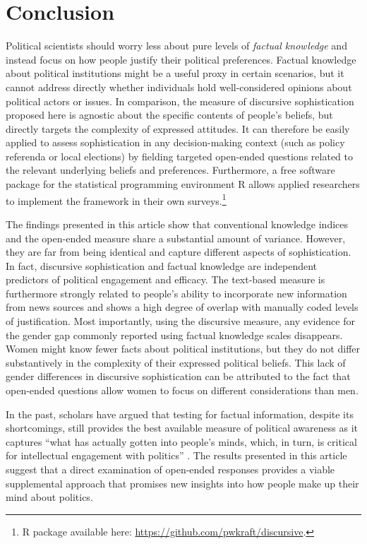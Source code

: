 \section*{Conclusion}

Political scientists should worry less about pure levels of \textit{factual knowledge} and instead focus on how people justify their political preferences. Factual knowledge about political institutions might be a useful proxy in certain scenarios, but it cannot address directly whether individuals hold well-considered opinions about political actors or issues. In comparison, the measure of discursive sophistication proposed here is agnostic about the specific contents of people's beliefs, but directly targets the complexity of expressed attitudes. It can therefore be easily applied to assess sophistication in any decision-making context (such as policy referenda or local elections) by fielding targeted open-ended questions related to the relevant underlying beliefs and preferences. Furthermore, a free software package for the statistical programming environment R allows applied researchers to implement the framework in their own surveys.\footnote{R package available here: \url{https://github.com/pwkraft/discursive}.}

The findings presented in this article show that conventional knowledge indices and the open-ended measure share a substantial amount of variance. However, they are far from being identical and capture different aspects of sophistication. In fact, discursive sophistication and factual knowledge are independent predictors of political engagement and efficacy. The text-based measure is furthermore strongly related to people's ability to incorporate new information from news sources and shows a high degree of overlap with manually coded levels of justification. Most importantly, using the discursive measure, any evidence for the gender gap commonly reported using factual knowledge scales disappears. Women might know fewer facts about political institutions, but they do not differ substantively in the complexity of their expressed political beliefs. This lack of gender differences in discursive sophistication can be attributed to the fact that open-ended questions allow women to focus on different considerations than men.

In the past, scholars have argued that testing for factual information, despite its shortcomings, still provides the best available measure of political awareness as it captures ``what has actually gotten into people's minds, which, in turn, is critical for intellectual engagement with politics'' \citet[21]{zaller1992nature}. The results presented in this article suggest that a direct examination of open-ended responses provides a viable supplemental approach that promises new insights into how people make up their mind about politics.

\clearpage
\singlespacing

